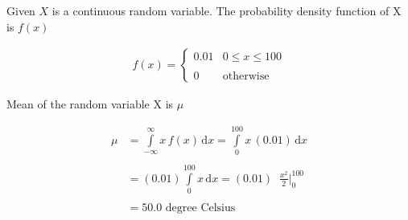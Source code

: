 Given \(X\) is a continuous random variable.
The probability density function of X is \(f(x)\)

\begin{align}
    f(x) = 
	\begin{cases}
	0.01 &  0 \leq x \leq 100\\ ~\\[-1em]
	0 & \text{otherwise}
	\end{cases}
\end{align}
\begin{flushleft}
Mean of the random variable X is \(\mu\)
\end{flushleft}
\begin{align}
    \mu &= \int\limits_{-\infty}^{\infty} x\,f(x)\,\mathrm{d}x =\displaystyle\int\limits_{0}^{100} x\,(0.01)\,\mathrm{d}x\\\nonumber\\
    &=(0.01)\displaystyle\int\limits_{0}^{100} x\,\mathrm{d}x = (0.01)\;\;\frac{x^2}{2}\bigg\vert_0^{100}\\\nonumber\\
    &=50.0 \text{  degree Celsius}\\\nonumber
\end{align}
